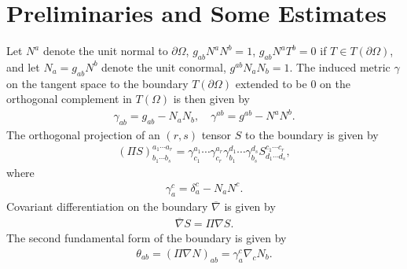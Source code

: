 \documentclass[12pt,reqno]{amsart}
\numberwithin{equation}{section}
\theoremstyle{definition}
\theoremstyle{remark}
\begin{document}
\appendix

\section{Preliminaries and Some Estimates}

Let $N^a$ denote the unit normal to ${\partial}\Omega$, $g_{ab}N^aN^b=1$, $g_{ab}N^a T^b=0$ if $T\in T({\partial}\Omega)$, and let $N_a=g_{ab}N^b$ denote the unit conormal, $g^{ab} N_aN_b=1$. The induced metric $\gamma$ on the tangent space to the boundary $T({\partial}\Omega)$ extended to be $0$ on the orthogonal complement in $T(\Omega)$ is then given by
\begin{align}
  \gamma_{ab}=g_{ab}-N_aN_b,\quad \gamma^{ab}=g^{ab}-N^aN^b.
\end{align}
The orthogonal projection of an $(r,s)$ tensor $S$ to the boundary is given by
\begin{align}
  (\Pi S)_{b_1\cdots b_s}^{a_1\cdots a_r}=\gamma_{c_1}^{a_1}\cdots \gamma_{c_r}^{a_r}\gamma_{b_1}^{d_1}\cdots \gamma_{b_s}^{d_s} S_{d_1\cdots d_s}^{c_1\cdots c_r},
\end{align}
where
\begin{align}\label{gammaauc}
  \gamma_a^c=\delta_a^c-N_aN^c.
\end{align}
Covariant differentiation on the boundary ${\overline{\nabla}}$ is given by
\begin{align}
  {\overline{\nabla}} S=\Pi{\nabla} S.
\end{align}
The second fundamental form of the boundary is given by
\begin{align}\label{2ndfundform}
  \theta_{ab}=(\Pi{\nabla} N)_{ab}=\gamma_a^c {\nabla}_c N_b.
\end{align}
\end{document}
